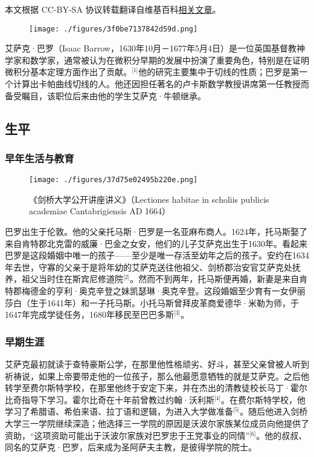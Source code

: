 
本文根据 CC-BY-SA 协议转载翻译自维基百科\href{https://en.wikipedia.org/wiki/Isaac_Barrow}{相关文章}。

\begin{figure}[ht]
\centering
\texttt{[image: ./figures/3f0be7137842d59d.png]}
\caption{} \label{fig_ASKbl_1}
\end{figure}
艾萨克·巴罗（Isaac Barrow，1630年10月－1677年5月4日）是一位英国基督教神学家和数学家，通常被认为在微积分早期的发展中扮演了重要角色，特别是在证明微积分基本定理方面作出了贡献。\(^\text{[1]}\)他的研究主要集中于切线的性质；巴罗是第一个计算出卡帕曲线切线的人。他还因担任著名的卢卡斯数学教授讲席第一任教授而备受瞩目，该职位后来由他的学生艾萨克·牛顿继承。
\subsection{生平}
\subsubsection{早年生活与教育}
\begin{figure}[ht]
\centering
\texttt{[image: ./figures/37d75e02495b220e.png]}
\caption{《剑桥大学公开讲座讲义》（Lectiones habitae in scholiis publicis academiae Cantabrigiensis AD 1664）} \label{fig_ASKbl_2}
\end{figure}
巴罗出生于伦敦。他的父亲托马斯·巴罗是一名亚麻布商人。1624年，托马斯娶了来自肯特郡北克雷的威廉·巴金之女安，他们的儿子艾萨克出生于1630年。看起来巴罗是这段婚姻中唯一的孩子——至少是唯一存活至幼年之后的孩子。安约在1634年去世，守寡的父亲于是将年幼的艾萨克送往他祖父、剑桥郡治安官艾萨克处抚养，祖父当时住在斯宾尼修道院\(^\text{[2]}\)。然而不到两年，托马斯便再婚，新妻是来自肯特郡梅德金的亨利·奥克辛登之妹凯瑟琳·奥克辛登。这段婚姻至少育有一女伊丽莎白（生于1641年）和一子托马斯。小托马斯曾拜皮革商爱德华·米勒为师，于1647年完成学徒任务，1680年移民至巴巴多斯\(^\text{[3]}\)。
\subsubsection{早期生涯}
艾萨克最初就读于查特豪斯公学，在那里他性格顽劣、好斗，甚至父亲曾被人听到祈祷说，如果上帝要带走他的一位孩子，那么他最愿意牺牲的就是艾萨克。之后他转学至费尔斯特学校，在那里他终于安定下来，并在杰出的清教徒校长马丁·霍尔比奇指导下学习。霍尔比奇在十年前曾教过约翰·沃利斯\(^\text{[4]}\)。在费尔斯特学校，他学习了希腊语、希伯来语、拉丁语和逻辑，为进入大学做准备\(^\text{[5]}\)。随后他进入剑桥大学三一学院继续深造；他选择三一学院的原因是沃波尔家族某位成员向他提供了资助，“这项资助可能出于沃波尔家族对巴罗忠于王党事业的同情”\(^\text{[6]}\)。他的叔叔、同名的艾萨克·巴罗，后来成为圣阿萨夫主教，是彼得学院的院士。

